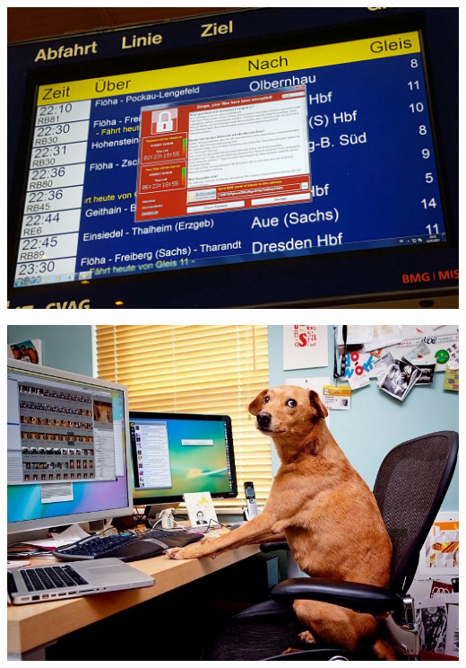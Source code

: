 \begin{frame}
	\centering\includegraphics[scale=0.9]{resources/wannacry.jpg}
\end{frame}

\begin{frame}
	\centering\includegraphics[scale=0.35]{resources/dog.jpg}
\end{frame}

